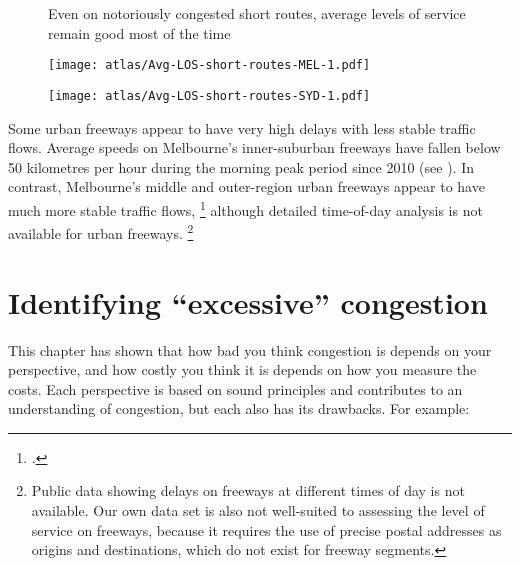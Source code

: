 \documentclass{grattan}
\begin{document}
\begin{figure*}
\begin{minipage}[t][\textheight]{\columnwidth}
	\caption{Even on notoriously congested short routes, average levels of service remain good most of the time}\label{fig:LOS-innersuburb-SYD}
	\texttt{[image: atlas/Avg-LOS-short-routes-MEL-1.pdf]}
\end{minipage}
\hfill
\begin{minipage}[t][\textheight]{\columnwidth}
  \caption*{\null}
  \units{\null}
  \texttt{[image: atlas/Avg-LOS-short-routes-SYD-1.pdf]}
  \null\vfill\null
\end{minipage}
\end{figure*}

Some urban freeways appear to have very high delays with less stable traffic flows. Average speeds on Melbourne's inner-suburban freeways have fallen below 50 kilometres per hour during the morning peak period since 2010 (see ). In contrast, Melbourne's middle and outer-region urban freeways appear to have much more stable traffic flows,%
    \footcite{Vicroads-201415-TravelSpeed-tableau}
although detailed time-of-day analysis is not available for urban freeways.%
    \footnote{Public data showing delays on freeways at different times of day is not available. Our own data set is also not well-suited to assessing the level of service on freeways, because it requires the use of precise postal addresses as origins and destinations, which do not exist for freeway segments.}


\section{Identifying ``excessive'' congestion}\label{sec:a-path-through}

This chapter has shown that how bad you think congestion is depends on your perspective, and how costly you think it is depends on how you measure the costs. Each perspective is based on sound principles and contributes to an understanding of congestion, but each also has its drawbacks. For example:
\end{document}
